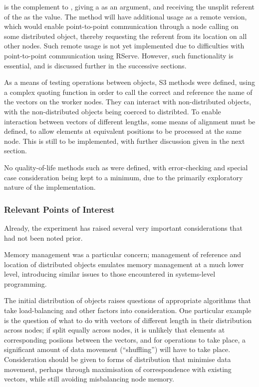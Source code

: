  is the complement to , giving a
 as an argument, and receiving the unsplit
referent of the  as the value. The method
will have additional usage as a remote version, which would enable
point-to-point communication through a node calling  on
some distributed object, thereby requesting the referent from its
location on all other nodes. Such remote usage is not yet implemented
due to difficulties with point-to-point communication using RServe.
However, such functionality is essential, and is discussed further in
the successive sections.

As a means of testing operations between 
objects, S3  methods were defined, using a complex quoting
function in order to call the correct  and reference
the name of the vectors on the worker nodes. They can interact with
non-distributed objects, with the non-distributed objects being coerced
to distribted. To enable interaction between vectors of different
lengths, some means of alignment must be defined, to allow elements at
equivalent positions to be processed at the same node. This is still to
be implemented, with further discussion given in the next section.

No quality-of-life methods such as  were defined, with
error-checking and special case consideration being kept to a minimum,
due to the primarily exploratory nature of the implementation.

\subsubsection{Relevant Points of Interest}\label{relevant-points-of-interest}

Already, the experiment has raised several very important considerations
that had not been noted prior.

Memory management was a particular concern; management of reference and
location of distributed objects emulates memory management at a much
lower level, introducing similar issues to those encountered in
systems-level programming.

The initial distribution of objects raises questions of appropriate
algorithms that take load-balancing and other factors into
consideration. One particular example is the question of what to do with
vectors of different length in their distribution across nodes; if split
equally across nodes, it is unlikely that elements at corresponding
posiions between the vectors, and for operations to take place, a
significant amount of data movement (``shuffling'') will have to take
place. Consideration should be given to forms of distribution that
minimise data movement, perhaps through maximisation of correspondence
with existing vectors, while still avoiding misbalancing node memory.

